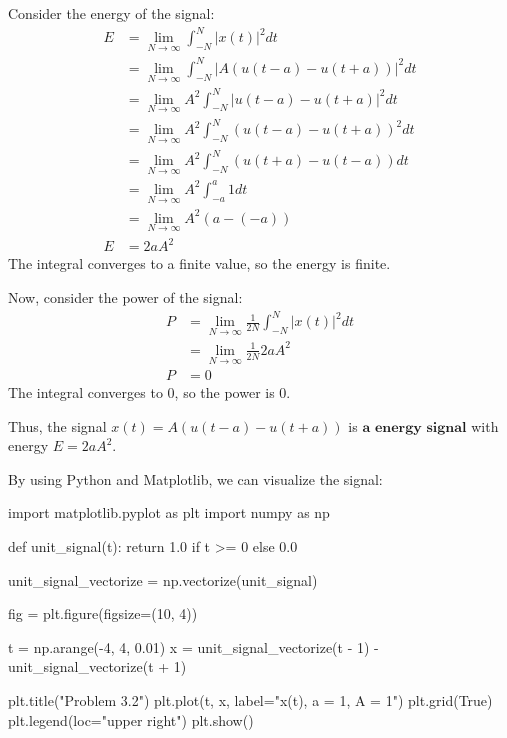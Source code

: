 \documentclass[a4paper, 10pt]{article}
\begin{document}
\begin{solution}
Consider the energy of the signal:
\begin{align*}
    E &= \lim_{N \to \infty} \int_{-N}^{N} |x(t)|^2 dt \\
    &= \lim_{N \to \infty} \int_{-N}^{N} |A(u(t-a) - u(t+a))|^2 dt \\
    &= \lim_{N \to \infty} A^2 \int_{-N}^{N} |u(t-a) - u(t+a)|^2 dt \\
    &= \lim_{N \to \infty} A^2 \int_{-N}^{N} (u(t-a) - u(t+a))^2 dt \\
    &= \lim_{N \to \infty} A^2 \int_{-N}^{N} (u(t+a) - u(t-a)) dt \\
    &= \lim_{N \to \infty} A^2 \int_{-a}^{a} 1 dt \\
    &= \lim_{N \to \infty} A^2 (a - (-a)) \\
    E &= 2aA^2
\end{align*}
The integral converges to a finite value, so the energy is finite.

\vspace{5mm}

Now, consider the power of the signal:
\begin{align*}
    P &= \lim_{N \to \infty} \frac{1}{2N} \int_{-N}^{N} |x(t)|^2 dt \\
    &= \lim_{N \to \infty} \frac{1}{2N} 2aA^2 \\
    P &= 0
\end{align*}
The integral converges to 0, so the power is 0.

\vspace{2mm}

Thus, the signal \( x(t) = A(u(t-a) - u(t+a)) \) is \( \boxed{\textbf{a energy signal}} \) with energy \( \boxed{E = 2aA^2} \).

\vspace{2mm}

By using Python and Matplotlib, we can visualize the signal:
\begin{codingbox}
import matplotlib.pyplot as plt
import numpy as np

def unit_signal(t):
    return 1.0 if t >= 0 else 0.0

unit_signal_vectorize = np.vectorize(unit_signal)

fig = plt.figure(figsize=(10, 4))

t = np.arange(-4, 4, 0.01)
x = unit_signal_vectorize(t - 1) - unit_signal_vectorize(t + 1)

plt.title("Problem 3.2")
plt.plot(t, x, label="x(t), a = 1, A = 1")
plt.grid(True)
plt.legend(loc="upper right")
plt.show()
\end{codingbox}


\end{solution}
\end{document}
